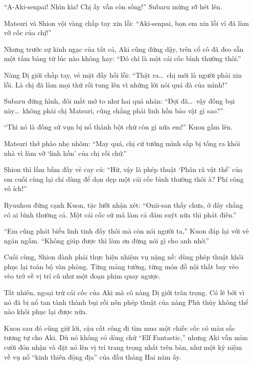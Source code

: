 \documentclass[../main.tex]{subfiles}
\begin{document}
``A-Aki-senpai! Nhìn kìa! Chị ấy vẫn còn sống!'' Subaru mừng rỡ hét lên.

Matsuri và Shion vội vàng chắp tay xin lỗi: ``Aki-senpai, bọn em xin lỗi vì đã làm vỡ cốc của chị!''

Nhưng trước sự kinh ngạc của tất cả, Aki cũng đứng dậy, trên cổ cô đã đeo sẵn một tấm bảng từ lúc nào không hay: ``Đó chỉ là một cái cốc bình thường thôi.''


Nàng Dị giới chắp tay, vẻ mặt đầy hối lỗi: ``Thật ra\dots\ chị mới là người phải xin lỗi. Là chị đã làm mọi thứ rối tung lên vì những lời nói quá đà của mình!''

Subaru đứng hình, đôi mắt mở to như hai quả nhãn: ``Đợi đã\dots\ vậy đống bụi này\dots\ không phải chị Matsuri, cũng chẳng phải linh hồn bảo vật gì sao?''

``Thì nó là đống sứ vụn bị nổ thành bột chứ còn gì nữa em!'' Kuon gầm lên.

Matsuri thở phào nhẹ nhõm: ``May quá, chị cứ tưởng mình sắp bị tống ra khỏi nhà vì làm vỡ `linh hồn' của chị rồi chứ.''

Shion thì lầm bầm đầy vẻ cay cú: ``Hừ, vậy là phép thuật `Phân rã vật thể' của em cuối cùng lại chỉ dùng để dọn dẹp một cái cốc bình thường thôi à? Phí công vô ích!''

Ryuuhou đứng cạnh Kuon, tặc lưỡi nhận xét: ``Onii-san thấy chưa, ở đây chẳng có ai bình thường cả. Một cái cốc sứ mà làm cả đám suýt nữa thì phát điên.''

``Em cũng phát biểu linh tinh đấy thôi mà còn nói người ta,'' Kuon đáp lại với vẻ ngán ngẩm. ``Không giúp được thì làm ơn đừng nói gì cho anh nhờ.''

Cuối cùng, Shion đành phải thực hiện nhiệm vụ nặng nề: dùng phép thuật khôi phục lại toàn bộ văn phòng. Từng mảng tường, từng món đồ nội thất bay vèo vèo trở về vị trí cũ như một đoạn phim quay ngược.

Tất nhiên, ngoại trừ cái cốc của Aki mà cô nàng Dị giới trân trọng. Có lẽ bởi vì nó đã bị nổ tan tành thành bụi rồi nên phép thuật của nàng Phù thủy không thể nào khôi phục lại được nữa.

Kuon sau đó cũng giữ lời, cậu cất công đi tìm mua một chiếc cốc có màu sắc tương tự cho Aki. Dù nó không có dòng chữ ``Elf Fantastic,'' nhưng Aki vẫn mỉm cười đón nhận và đặt nó lên vị trí trang trọng nhất trên bàn, như một kỷ niệm về vụ nổ ``kinh thiên động địa'' của đầu tháng Hai năm ấy.
\end{document}
